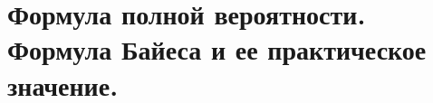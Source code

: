 \documentclass[polytech/stats/exam-2023/stats-exam-2023.tex]{subfiles}
\begin{document}
\section{Формула полной вероятности. Формула Байеса и ее практическое значение.}
\end{document}
